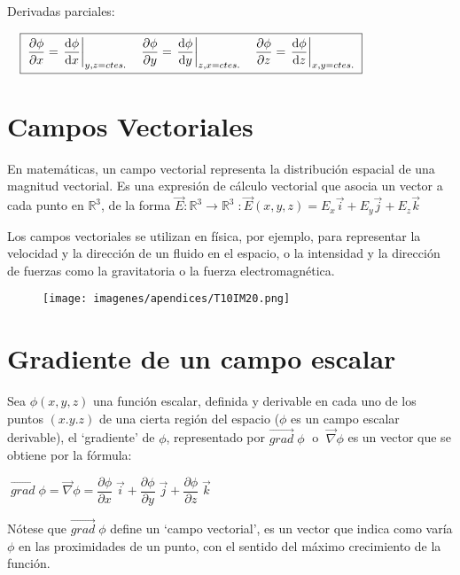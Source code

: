 Derivadas parciales: 

$\quad \boxed{\; \dfrac{\partial \phi}{\partial x}=\eval {\dfrac {\dd \phi}{\dd x}}_{y,z=ctes.} \quad \dfrac{\partial \phi}{\partial y}=\eval {\dfrac {\dd \phi}{\dd y}}_{z,x=ctes.} \quad \dfrac{\partial \phi}{\partial z}=\eval {\dfrac {\dd \phi}{\dd z}}_{x,y=ctes.} \;} $

\section{Campos Vectoriales}
\begin{multicols}{2}
	En matemáticas, un campo vectorial representa la distribución espacial de una magnitud vectorial. Es una expresión de cálculo vectorial que asocia un vector a cada punto en $\mathbb R^3$, de la forma $\vec E: \mathbb R^3 \to \mathbb R^3 \; : \vec E (x,y,z)= E_x \vec i + E_y \vec j + E_z \vec k$
	
	Los campos vectoriales se utilizan en física, por ejemplo, para representar la velocidad y la dirección de un fluido en el espacio, o la intensidad y la dirección de fuerzas como la gravitatoria o la fuerza electromagnética.
	
	\begin{figure}[H]
	\centering
	\texttt{[image: imagenes/apendices/T10IM20.png]}
	\end{figure}
\end{multicols}

\section{Gradiente de un campo escalar}

Sea $\phi (x,y,z)$ una función escalar, definida y derivable en cada uno de los puntos $(x.y.z)$ de una cierta región del espacio ($\phi$ es un campo escalar derivable), el `gradiente' de $\phi$, representado por $\overrightarrow {grad}\;  \phi\; $ o   $\; \overrightarrow{\nabla} \phi$ es un vector que se obtiene por la fórmula:

\vspace{4mm}\centerline{ $\boxed{ \; \overrightarrow {grad} \; \phi =  \overrightarrow {\nabla} \phi = \dfrac {\partial \phi}{\partial x}\; \vec i +  \dfrac {\partial \phi}{\partial y}\; \vec j +  \dfrac {\partial \phi}{\partial z}\; \vec k   \;} $}

Nótese que $\overrightarrow {grad} \; \phi $ define un `campo vectorial', es un vector que indica como varía $\phi$ en las proximidades de un punto, con el sentido del máximo crecimiento de la función.

